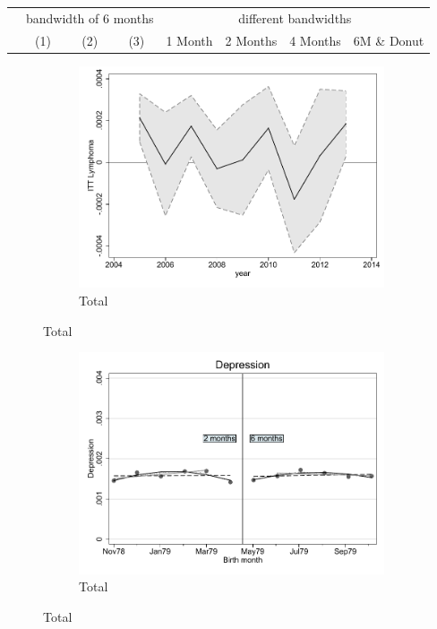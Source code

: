 \documentclass[a4paper ]{article}
\begin{document}
\begin{table}[h]\centering
\def\sym#1{\ifmmode^{#1}\else\(^{#1}\)\fi}
\begin{tabular}{l*{3}{c}|cccc}
\toprule
&\multicolumn{3}{c}{bandwidth of 6 months} & \multicolumn{4}{c}{different bandwidths} \\
 \cmidrule(lr{1em}){2-4} \cmidrule(lr{1em}){5-8}
 &\multicolumn{1}{c}{(1)}&\multicolumn{1}{c}{(2)}&\multicolumn{1}{c}{(3)}& 1 Month & 2 Months & 4 Months & 6M \& Donut \\
\midrule 

\bottomrule
\end{tabular}
\end{table}

\begin{figure}[h!]
	\centering
	\begin{subfigure}[t]{0.5\textwidth}
		\centering
		\includegraphics[width=0.99\textwidth]{R1_LC_Lymphoma}
		\caption{Total}		
	\end{subfigure}
\end{figure}
\newpage
\begin{figure}[h]
	\centering
	\begin{subfigure}[t]{0.5\textwidth}
		\centering
		\includegraphics[width=0.99\textwidth]{R1_RD_Depression_fits}
		\caption{Total}		
	\end{subfigure}
\end{figure}
\end{document}
